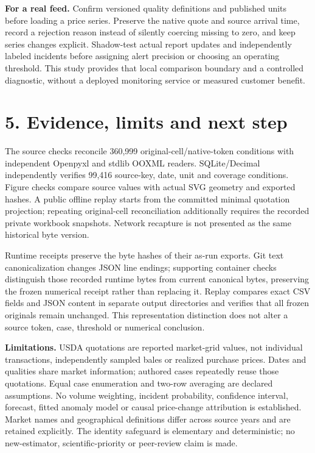 \documentclass[10pt,letterpaper]{article}
\begin{document}
\textbf{For a real feed.} Confirm versioned quality definitions and published units before loading a price series. Preserve the native quote and source arrival time, record a rejection reason instead of silently coercing missing to zero, and keep series changes explicit. Shadow-test actual report updates and independently labeled incidents before assigning alert precision or choosing an operating threshold. This study provides that local comparison boundary and a controlled diagnostic, without a deployed monitoring service or measured customer benefit.
\newpage
\section*{5. Evidence, limits and next step}
The source checks reconcile 360,999 original-cell/native-token conditions with independent Openpyxl and stdlib OOXML readers. SQLite/Decimal independently verifies 99,416 source-key, date, unit and coverage conditions. Figure checks compare source values with actual SVG geometry and exported hashes. A public offline replay starts from the committed minimal quotation projection; repeating original-cell reconciliation additionally requires the recorded private workbook snapshots. Network recapture is not presented as the same historical byte version.

Runtime receipts preserve the byte hashes of their as-run exports. Git text canonicalization changes JSON line endings; supporting container checks distinguish those recorded runtime bytes from current canonical bytes, preserving the frozen numerical receipt rather than replacing it. Replay compares exact CSV fields and JSON content in separate output directories and verifies that all frozen originals remain unchanged. This representation distinction does not alter a source token, case, threshold or numerical conclusion.

\textbf{Limitations.} USDA quotations are reported market-grid values, not individual transactions, independently sampled bales or realized purchase prices. Dates and qualities share market information; authored cases repeatedly reuse those quotations. Equal case enumeration and two-row averaging are declared assumptions. No volume weighting, incident probability, confidence interval, forecast, fitted anomaly model or causal price-change attribution is established. Market names and geographical definitions differ across source years and are retained explicitly. The identity safeguard is elementary and deterministic; no new-estimator, scientific-priority or peer-review claim is made.
\end{document}
